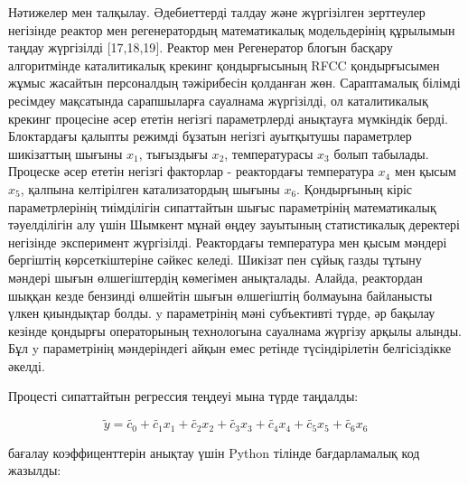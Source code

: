\begin{multicols}{2}
Нәтижелер мен талқылау. Әдебиеттерді талдау және жүргізілген
зерттеулер негізінде реактор мен регенератордың математикалық
модельдерінің құрылымын таңдау жүргізілді {[}17,18,19{]}. Реактор мен
Регенератор блогын басқару алгоритмінде каталитикалық крекинг
қондырғысының RFCC қондырғысымен жұмыс жасайтын персоналдың
тәжірибесін қолданған жөн.  Сараптамалық білімді ресімдеу мақсатында
сарапшыларға сауалнама жүргізілді, ол каталитикалық крекинг процесіне
әсер ететін негізгі параметрлерді анықтауға мүмкіндік
берді. Блоктардағы қалыпты режимді бұзатын негізгі ауытқытушы
параметрлер шикізаттың шығыны $x_1$, тығыздығы $x_2$, температурасы $x_3$ болып
табылады. Процеске әсер ететін негізгі факторлар - реактордағы
температура $x_4$ мен қысым $x_5$, қалпына келтірілген катализатордың шығыны
$x_6$. Қондырғының кіріс параметрлерінің тиімділігін сипаттайтын шығыс
параметрінің математикалық тәуелділігін алу үшін Шымкент мұнай өңдеу
зауытының статистикалық деректері негізінде эксперимент
жүргізілді. Реактордағы температура мен қысым мәндері бергіштің
көрсеткіштеріне сәйкес келеді. Шикізат пен сұйық газды тұтыну мәндері
шығын өлшегіштердің көмегімен анықталады. Алайда, реактордан шыққан
кезде бензинді өлшейтін шығын өлшегіштің болмауына байланысты үлкен
қиындықтар болды. y параметрінің мәні субъективті түрде, әр бақылау
кезінде қондырғы операторының технологына сауалнама жүргізу арқылы
алынды. Бұл y параметрінің мәндеріндегі айқын емес ретінде
түсіндірілетін белгісіздікке әкелді.

Процесті сипаттайтын регрессия теңдеуі мына түрде таңдалды:
\end{multicols}

\begin{equation}
\tilde{y}=\tilde{c_0}+\tilde{c_1}x_1+\tilde{c_2}x_2+\tilde{c_3}x_3+\tilde{c_4}x_4+\tilde{c_5}x_5+\tilde{c_6}x_6
\end{equation}

бағалау коэффиценттерін анықтау үшін Python тілінде бағдарламалық код жазылды:

